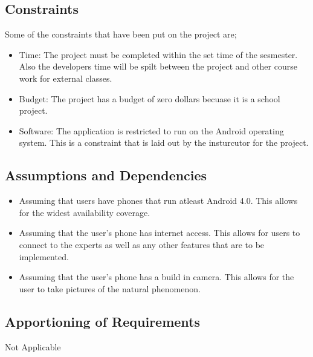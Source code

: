 \documentclass[]{article}
\begin{document}
\subsection{Constraints}

\label{sub:constraints}
Some of the constraints that have been put on the project are;
\begin{itemize}
	\item Time: The project must be completed within the set time of the sesmester. Also the developers time will be spilt between the project and other course work for external classes. 
	\item Budget: The project has a budget of zero dollars becuase it is a school project. 
	\item Software: The application is restricted to run on the Android operating system. This is a constraint that is laid out by the insturcutor for the project. 
\end{itemize}

\subsection{Assumptions and Dependencies}
\label{sub:assumptions_and_dependencies}
\begin{itemize}
	\item Assuming that users have phones that run atleast Android 4.0. This allows for the widest availability coverage. 
	\item Assuming that the user's phone has internet access. This allows for users to connect to the experts as well as any other features that are to be implemented.  
	\item Assuming that the user's phone has a build in camera. This allows for the user to take pictures of the natural phenomenon.  
\end{itemize}

\subsection{Apportioning of Requirements}
\label{sub:apportioning_of_requirements}
Not Applicable
\end{document}

